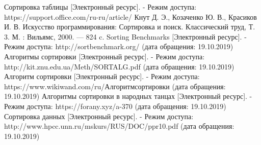 %



\begin{enumerate}
\bibitem{} Сортировка таблицы [Электронный ресурс]. - Режим доступа: https://support.office.com/ru-ru/article/
\bibitem{} Кнут Д. Э., Козаченко Ю. В., Красиков И. В. Искусство программирования: Сортировка и поиск. Классический труд, Т. 3. М. : Вильямс, 2000. –– 824 c.
\bibitem{}  Sorting Benchmarks [Электронный ресурс]. - Режим доступа: http://sortbenchmark.org/ (дата обращения: 19.10.2019)
\bibitem{}  Алгоритмы сортировки [Электронный ресурс]. - Режим доступа: http://kit.znu.edu.ua/Meth/SORTALG.pdf (дата обращения: 19.10.2019)
\bibitem{} Алгоритм сортировки [Электронный ресурс]. - Режим доступа: https://www.wikiwand.com/ru/Алгоритмсортировки (дата обращения: 19.10.2019)
\bibitem{}  Алгоритмы сортировки в народных танцах [Электронный ресурс]. - Режим доступа: https://forany.xyz/a-370 (дата обращения: 19.10.2019)
\bibitem{}  Сортировка данных [Электронный ресурс]. - Режим доступа: http://www.hpcc.unn.ru/mskurs/RUS/DOC/ppr10.pdf (дата обращения: 19.10.2019)
\end{enumerate}
